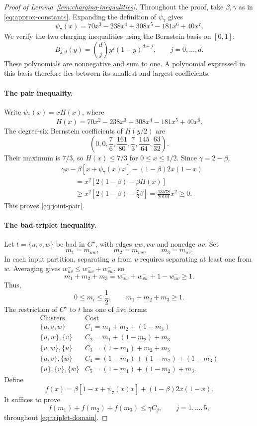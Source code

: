 \documentclass[11pt]{article}
\theoremstyle{definition}
\theoremstyle{remark}
\newcommand{\1}{\mathbf{1}}
\begin{document}
\begin{proof}[Proof of Lemma~\ref{lem:charging-inequalities}]
Throughout the proof, take $\beta,\gamma$ as in
\eqref{eq:approx-constants}. Expanding the definition of
$\psi_7$ gives
\[
    \psi_7(x)=70x^3-238x^4+308x^5-181x^6+40x^7.
\]
We verify the two charging inequalities using the Bernstein
basis on $[0,1]$:
\[
    B_{j,d}(y)=\binom{d}{j}y^j(1-y)^{d-j},
    \qquad j=0,\ldots,d.
\]
These polynomials are nonnegative and sum to one. A polynomial
expressed in this basis therefore lies between its smallest
and largest coefficients.

\paragraph{The pair inequality.}
Write $\psi_7(x)=xH(x)$, where
\[
    H(x)=70x^2-238x^3+308x^4-181x^5+40x^6.
\]
The degree-six Bernstein coefficients of $H(y/2)$ are
\[
    \left(0,0,\frac76,\frac{161}{80},
        \frac73,\frac{145}{64},\frac{63}{32}\right).
\]
Their maximum is $7/3$, so $H(x)\leq7/3$ for
$0\leq x\leq1/2$. Since $\gamma=2-\beta$,
\begin{align*}
    &\gamma x-\beta[x+\psi_7(x)x]-(1-\beta)2x(1-x)\\
    &\qquad=x^2[2(1-\beta)-\beta H(x)]\\
    &\qquad\geq x^2\left[2(1-\beta)-\frac73\beta\right]
        =\frac{13578}{20101}x^2\geq0.
\end{align*}
This proves \eqref{eq:joint-pair}.

\paragraph{The bad-triplet inequality.}
Let $t=\{u,v,w\}$ be bad in $G^\star$, with edges $uw,vw$
and nonedge $uv$. Set
\[
    m_1=m_{uw},\qquad m_2=m_{vw},\qquad m_3=m_{uv}.
\]
In each input partition, separating $u$ from $v$ requires
separating at least one from $w$. Averaging gives
$w_{uv}^-\leq w_{uw}^-+w_{vw}^-$, so
\[
    m_1+m_2+m_3
        =w_{uw}^-+w_{vw}^-+1-w_{uv}^-\geq1.
\]
Thus,
\begin{equation}
    0\leq m_i\leq\frac12,
    \qquad m_1+m_2+m_3\geq1.
    \label{eq:triplet-domain}
\end{equation}
The restriction of $C^\star$ to $t$ has one of five forms:
\[
\begin{array}{c|l}
    \text{Clusters} & \text{Cost}\\
    \hline
    \{u,v,w\} & C_1=m_1+m_2+(1-m_3)\\
    \{u,w\},\{v\} & C_2=m_1+(1-m_2)+m_3\\
    \{v,w\},\{u\} & C_3=(1-m_1)+m_2+m_3\\
    \{u,v\},\{w\} & C_4=(1-m_1)+(1-m_2)+(1-m_3)\\
    \{u\},\{v\},\{w\} & C_5=(1-m_1)+(1-m_2)+m_3.
\end{array}
\]
Define
\[
    f(x)=\beta[1-x+\psi_7(x)x]+(1-\beta)2x(1-x).
\]
It suffices to prove
\[
    f(m_1)+f(m_2)+f(m_3)\leq\gamma C_j,
    \qquad j=1,\ldots,5,
\]
throughout \eqref{eq:triplet-domain}.


\end{proof}
\end{document}
